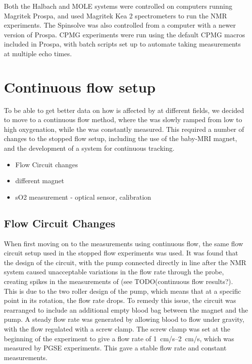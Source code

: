 Both the Halbach and MOLE systems were controlled on computers running Magritek Prospa, and used Magritek Kea 2 spectrometers to run the NMR experiments.
The Spinsolve was also controlled from a computer with a newer version of Prospa.
CPMG experiments were run using the default CPMG macros included in Prospa, with batch scripts set up to automate taking measurements at multiple echo times.

\section{Continuous flow setup}
\label{sec:exptsetup-contflow}

To be able to get better data on how \Ttwo is affected by \SOtwo at different fields, we decided to move to a continuous flow method, where the \SOtwo was slowly ramped from low to high oxygenation, while the \Ttwo was constantly measured.
This required a number of changes to the stopped flow setup, including the use of the baby-MRI magnet, and the development of a system for continuous \SOtwo tracking.


\begin{itemize}
\item Flow Circuit changes
\item different magnet
\item sO2 measurement - optical sensor, calibration
\end{itemize}

\subsection{Flow Circuit Changes}
When first moving on to the measurements using continuous flow, the same flow circuit setup used in the stopped flow experiments was used.
It was found that the design of the circuit, with the pump connected directly in line after the NMR system caused unacceptable variations in the flow rate through the probe, creating spikes in the measurements of \Ttwo (see TODO(continuous flow results?).
This is due to the two roller design of the pump, which means that at a specific point in its rotation, the flow rate drops.
To remedy this issue, the circuit was rearranged to include an additional empty blood bag between the magnet and the pump.
A steady flow rate was generated by allowing blood to flow under gravity, with the flow regulated with a screw clamp.
The screw clamp was set at the beginning of the experiment to give a flow rate of \SIrange{1}{2}{cm/s}, which was measured by PGSE experiments.
This gave a stable flow rate and constant \Ttwo measurements.

